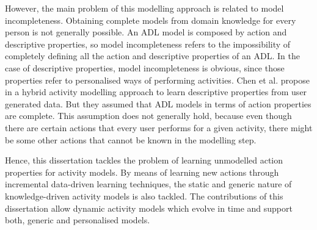 However, the main problem of this modelling approach is related to model incompleteness. Obtaining complete models from domain knowledge for every person is not generally possible. An ADL model is composed by action and descriptive properties, so model incompleteness refers to the impossibility of completely defining all the action and descriptive properties of an ADL. In the case of descriptive properties, model incompleteness is obvious, since those properties refer to personalised ways of performing activities. Chen et al. propose in \cite{Chen2014} a hybrid activity modelling approach to learn descriptive properties from user generated data. But they assumed that ADL models in terms of action properties are complete. This assumption does not generally hold, because even though there are certain actions that every user performs for a given activity, there might be some other actions that cannot be known in the modelling step. 

Hence, this dissertation tackles the problem of learning unmodelled action properties for activity models. By means of learning new actions through incremental data-driven learning techniques, the static and generic nature of knowledge-driven activity models is also tackled. The contributions of this dissertation allow dynamic activity models which evolve in time and support both, generic and personalised models.